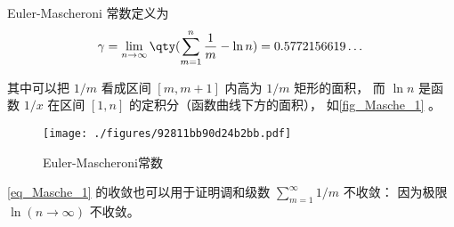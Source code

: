 
\begin{issues}
\issueDraft
\end{issues}


Euler-Mascheroni 常数定义为
\begin{equation}\label{eq_Masche_1}
\gamma = \lim_{n\to\infty} \qty(\sum_{m=1}^n \frac{1}{m} - \ln n) = 0.5772156619\dots
\end{equation}

其中可以把 $1/m$ 看成区间 $[m, m+1]$ 内高为 $1/m$ 矩形的面积， 而 $\ln n$ 是函数 $1/x$ 在区间 $[1,n]$ 的定积分（函数曲线下方的面积）， 如\autoref{fig_Masche_1} 。

\begin{figure}[ht]
\centering
\texttt{[image: ./figures/92811bb90d24b2bb.pdf]}
\caption{Euler-Mascheroni常数} \label{fig_Masche_1}
\end{figure}

\autoref{eq_Masche_1} 的收敛也可以用于证明调和级数 $\sum_{m=1}^\infty 1/m$ 不收敛： 因为极限 $\ln(n\to\infty)$ 不收敛。

